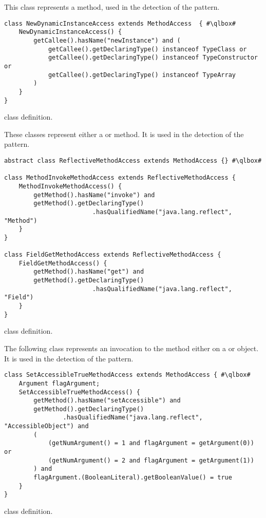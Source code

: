 This class represents a  method,
used in the detection of the  pattern.

\begin{listing}
\begin{verbatim}
class NewDynamicInstanceAccess extends MethodAccess  { #\qlbox#
	NewDynamicInstanceAccess() {
		getCallee().hasName("newInstance") and (
			getCallee().getDeclaringType() instanceof TypeClass or
			getCallee().getDeclaringType() instanceof TypeConstructor or
			getCallee().getDeclaringType() instanceof TypeArray
		)
	}
}
\end{verbatim}
\caption{ class definition.}
\label{lst:ql:NewDynamicInstanceAccess}
\end{listing}


These classes represent either a  or  method.
It is used in the detection of the  pattern.

\begin{listing}
\begin{verbatim}	
abstract class ReflectiveMethodAccess extends MethodAccess {} #\qlbox#

class MethodInvokeMethodAccess extends ReflectiveMethodAccess {
	MethodInvokeMethodAccess() {
		getMethod().hasName("invoke") and
		getMethod().getDeclaringType()
						.hasQualifiedName("java.lang.reflect", "Method")
	}
}

class FieldGetMethodAccess extends ReflectiveMethodAccess {
	FieldGetMethodAccess() {
		getMethod().hasName("get") and
		getMethod().getDeclaringType()
						.hasQualifiedName("java.lang.reflect", "Field")
	}
}
\end{verbatim}
\caption{ class definition.}
\label{lst:ql:ReflectiveMethodAccess}
\end{listing}

The following class represents an invocation to the  method either on a  or  object.
It is used in the detection of the  pattern.

\begin{listing}
\begin{verbatim}
class SetAccessibleTrueMethodAccess extends MethodAccess { #\qlbox#
	Argument flagArgument;
	SetAccessibleTrueMethodAccess() {
		getMethod().hasName("setAccessible") and
		getMethod().getDeclaringType()
				.hasQualifiedName("java.lang.reflect", "AccessibleObject") and
		(
			(getNumArgument() = 1 and flagArgument = getArgument(0)) or
			(getNumArgument() = 2 and flagArgument = getArgument(1))
		) and
		flagArgument.(BooleanLiteral).getBooleanValue() = true
	}	
}
\end{verbatim}
\caption{ class definition.}
\label{lst:ql:SetAccessibleTrueMethodAccess}
\end{listing}

